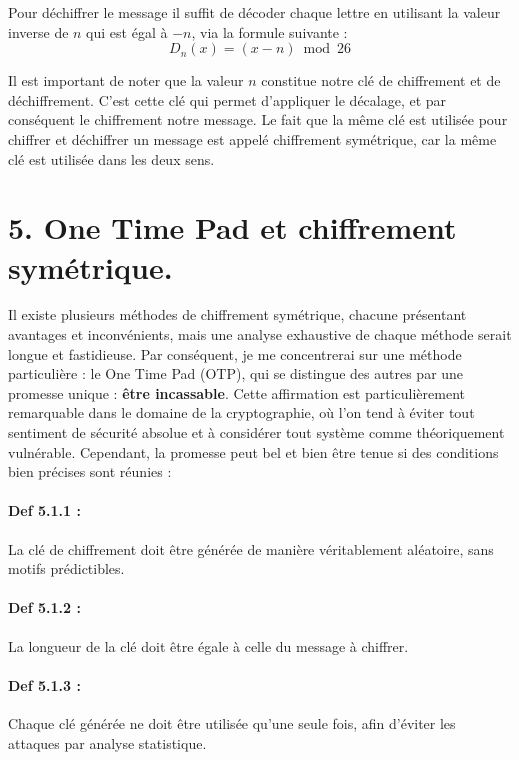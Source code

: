 \documentclass[
  paper=a4,
  ,captions=tableheading
]{scrartcl}
\begin{document}
Pour déchiffrer le message il suffit de décoder chaque lettre en
utilisant la valeur inverse de \(n\) qui est égal à \(-n\), via la
formule suivante : \[
D_n(x)=(x-n) \bmod 26
\]

Il est important de noter que la valeur \(n\) constitue notre clé de
chiffrement et de déchiffrement. C'est cette clé qui permet d'appliquer
le décalage, et par conséquent le chiffrement notre message. Le fait que
la même clé est utilisée pour chiffrer et déchiffrer un message est
appelé chiffrement symétrique, car la même clé est utilisée dans les
deux sens.

\section{5. One Time Pad et chiffrement
symétrique.}\label{one-time-pad-et-chiffrement-symuxe9trique.}

Il existe plusieurs méthodes de chiffrement symétrique, chacune
présentant avantages et inconvénients, mais une analyse exhaustive de
chaque méthode serait longue et fastidieuse. Par conséquent, je me
concentrerai sur une méthode particulière : le One Time Pad (OTP), qui
se distingue des autres par une promesse unique : \textbf{être
incassable}. Cette affirmation est particulièrement remarquable dans le
domaine de la cryptographie, où l'on tend à éviter tout sentiment de
sécurité absolue et à considérer tout système comme théoriquement
vulnérable. Cependant, la promesse peut bel et bien être tenue si des
conditions bien précises sont réunies :

\paragraph{Def 5.1.1 :}\label{def-5.1.1}

La clé de chiffrement doit être générée de manière véritablement
aléatoire, sans motifs prédictibles.

\paragraph{Def 5.1.2 :}\label{def-5.1.2}

La longueur de la clé doit être égale à celle du message à chiffrer.

\paragraph{Def 5.1.3 :}\label{def-5.1.3}

Chaque clé générée ne doit être utilisée qu'une seule fois, afin
d'éviter les attaques par analyse statistique.
\end{document}
